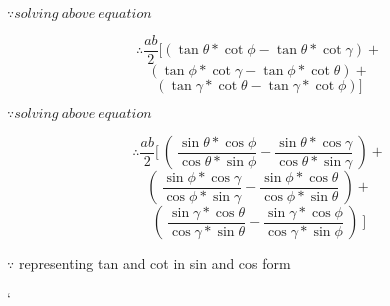 \documentclass[journal,12pt,twocolumn]{IEEEtran}
\begin{document}
\begin{flushright}
$\because  solving~above~equation $
\end{flushright}
\vspace{0.2cm}
$$ \therefore \frac{ab}{2}[\left(\tan\theta*\cot\phi -\tan\theta*\cot\gamma\right)+$$$$ \left(\tan\phi*\cot\gamma -\tan\phi*\cot\theta\right) + $$$$\left(\tan\gamma*\cot\theta -\tan\gamma*\cot\phi\right)]$$ 
\begin{flushright}
$\because  solving~above~equation $
\end{flushright}


$$\therefore \frac{ab}{2}[~(~\frac{\sin\theta*\cos\phi}{\cos\theta*\sin\phi}- \frac{\sin\theta*\cos\gamma}{\cos\theta*\sin\gamma}~)+$$ 
    $$(~\frac{\sin\phi*\cos\gamma}{\cos\phi*\sin\gamma}-\frac{\sin\phi*\cos\theta}{\cos\phi*\sin\theta}~)
    +$$
    $$(~\frac{\sin\gamma*\cos\theta}{\cos\gamma*\sin\theta}-\frac{\sin\gamma*\cos\phi}{\cos\gamma*\sin\phi}~)~]$$
\begin{flushright}
$\because$ representing tan and cot in sin and cos form\end{flushright} `

\end{document}
